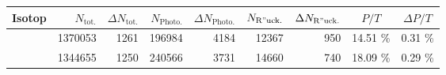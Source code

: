 \begin{tabular}{lrrrrrrSS}
	\toprule
	{Isotop} & {$N_\mathrm{tot.}$} & {$\Delta N_\mathrm{tot.}$} & {$N_\mathrm{Photo.}$} & {$\Delta N_\mathrm{Photo.}$} & {$N_\mathrm{R"uck.}$} & {$\Delta N_\mathrm{R"uck.}$} & {$P/T$}   & {$\Delta P/T$} \\
	\midrule
	 & 1370053    & 1261   & 196984    & 4184   & 12367         & 950  & 14.51 \% & 0.31 \% \\
	 & 1344655    & 1250   & 240566    & 3731   & 14660         & 740   & 18.09 \% & 0.29 \% \\
	\bottomrule
\end{tabular}
